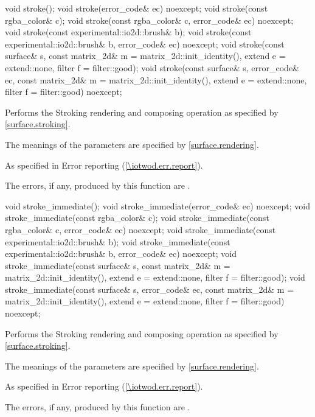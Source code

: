 \begin{itemdecl}
void stroke();
void stroke(error_code& ec) noexcept;
void stroke(const rgba_color& c);
void stroke(const rgba_color& c, error_code& ec) noexcept;
void stroke(const experimental::io2d::brush& b);
void stroke(const experimental::io2d::brush& b, error_code& ec) noexcept;
void stroke(const surface& s,
  const matrix_2d& m = matrix_2d::init_identity(), extend e = extend::none,
  filter f = filter::good);
void stroke(const surface& s, error_code& ec, 
  const matrix_2d& m = matrix_2d::init_identity(), extend e = extend::none,
  filter f = filter::good) noexcept;
\end{itemdecl}
\begin{itemdescr}
\pnum
\effects
Performs the Stroking rendering and composing operation as specified by \ref{surface.stroking}.

\pnum
The meanings of the parameters are specified by \ref{surface.rendering}.

\pnum
\throws
As specified in Error reporting (\ref{\iotwod.err.report}).

\pnum
\errors
The errors, if any, produced by this function are .
\end{itemdescr}

\begin{itemdecl}
void stroke_immediate();
void stroke_immediate(error_code& ec) noexcept;
void stroke_immediate(const rgba_color& c);
void stroke_immediate(const rgba_color& c, error_code& ec) noexcept;
void stroke_immediate(const experimental::io2d::brush& b);
void stroke_immediate(const experimental::io2d::brush& b, error_code& ec)
  noexcept;
void stroke_immediate(const surface& s,
  const matrix_2d& m = matrix_2d::init_identity(), extend e = extend::none, 
  filter f = filter::good);
void stroke_immediate(const surface& s, error_code& ec, 
  const matrix_2d& m = matrix_2d::init_identity(), extend e = extend::none,
  filter f = filter::good) noexcept;
\end{itemdecl}
\begin{itemdescr}
\pnum
\effects
Performs the Stroking rendering and composing operation as specified by \ref{surface.stroking}.

\pnum
The meanings of the parameters are specified by \ref{surface.rendering}.

\pnum
\throws
As specified in Error reporting (\ref{\iotwod.err.report}).

\pnum
\errors
The errors, if any, produced by this function are .
\end{itemdescr}

